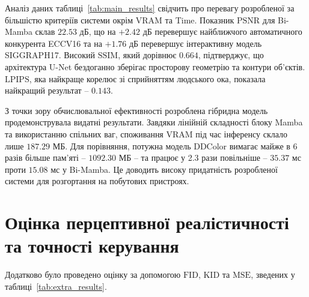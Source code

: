         Аналіз даних таблиці~\ref{tab:main_results} свідчить про перевагу розробленої за більшістю критеріїв системи окрім $\mathrm{VRAM}$ та $\mathrm{Time}$.
        Показник $\mathrm{PSNR}$ для Bi-Mamba склав $22.53$ дБ, що на $+2.42$ дБ перевершує найближчого автоматичного конкурента ECCV16 та на $+1.76$ дБ перевершує інтерактивну модель SIGGRAPH17.
        Високий $\mathrm{SSIM}$, який дорівнює $0.664$, підтверджує, що архітектура U-Net бездоганно зберігає просторову геометрію та контури об'єктів.
        $\mathrm{LPIPS}$, яка найкраще корелює зі сприйняттям людського ока, показала найкращий результат -- $0.143$.

        З точки зору обчислювальної ефективності розроблена гібридна модель продемонструвала видатні результати.
        Завдяки лінійній складності блоку Mamba та використанню спільних ваг, споживання $\mathrm{VRAM}$ під час інференсу склало лише $187.29$ МБ.
        Для порівняння, потужна модель DDColor вимагає майже в 6 разів більше пам'яті -- $1092.30$ МБ -- та працює у 2.3 рази повільніше -- $35.37$ мс проти $15.08$ мс у Bi-Mamba.
        Це доводить високу придатність розробленої системи для розгортання на побутових пристроях.

    \section{Оцінка перцептивної реалістичності та точності керування}

        Додатково було проведено оцінку за допомогою $\mathrm{FID}$, $\mathrm{KID}$ та $\mathrm{MSE}$, зведених у таблиці~\ref{tab:extra_results}.

